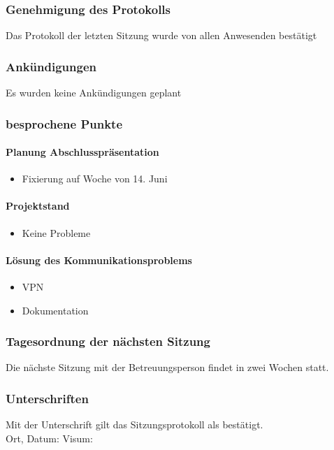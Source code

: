 \subsubsection{Genehmigung des Protokolls}
Das Protokoll der letzten Sitzung wurde von allen Anwesenden bestätigt
\subsubsection{Ankündigungen}
Es wurden keine Ankündigungen geplant
\subsubsection{besprochene Punkte}
\paragraph{Planung Abschlusspräsentation}
\begin{itemize}
	\item Fixierung auf Woche von 14. Juni
\end{itemize}
\paragraph{Projektstand}
\begin{itemize}
	\item Keine Probleme 
\end{itemize}

\paragraph{Lösung des Kommunikationsproblems}
\begin{itemize}
	\item VPN
	\item Dokumentation
\end{itemize}


\subsubsection{Tagesordnung der nächsten Sitzung}
Die nächste Sitzung mit der Betreuungsperson findet in zwei Wochen statt. 
\subsubsection{Unterschriften}

Mit der Unterschrift gilt das Sitzungsprotokoll als bestätigt.\\

Ort, Datum:	\underline{\hspace*{6cm}}	\hspace*{1cm} Visum:	\underline{\hspace*{4cm}}
